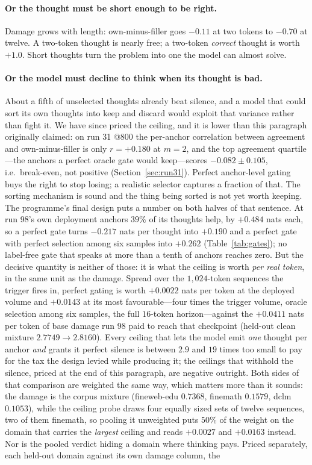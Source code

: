 \documentclass{article} %
\begin{document}
\paragraph{Or the thought must be short enough to be right.} Damage grows with length: own-minus-filler goes $-0.11$ at two tokens to $-0.70$ at twelve. A two-token thought is nearly free; a two-token \emph{correct} thought is worth $+1.0$. Short thoughts turn the problem into one the model can almost solve.

\paragraph{Or the model must decline to think when its thought is bad.} About a fifth of unselected thoughts already beat silence, and a model that could sort its own thoughts into keep and discard would exploit that variance rather than fight it. We have since priced the ceiling, and it is lower than this paragraph originally claimed: on run 31 @800 the per-anchor correlation between agreement and own-minus-filler is only $r = +0.180$ at $m=2$, and the top agreement quartile---the anchors a perfect oracle gate would keep---scores $-0.082 \pm 0.105$, i.e.\ break-even, not positive (Section~\ref{sec:run31}). Perfect anchor-level gating buys the right to stop losing; a realistic selector captures a fraction of that. The sorting mechanism is sound and the thing being sorted is not yet worth keeping. The programme's final design puts a number on both halves of that sentence. At run 98's own deployment anchors $39\%$ of its thoughts help, by $+0.484$ nats each, so a perfect gate turns $-0.217$ nats per thought into $+0.190$ and a perfect gate with perfect selection among six samples into $+0.262$ (Table~\ref{tab:gates}); no label-free gate that speaks at more than a tenth of anchors reaches zero. But the decisive quantity is neither of those: it is what the ceiling is worth \emph{per real token}, in the same unit as the damage. Spread over the $1{,}024$-token sequences the trigger fires in, perfect gating is worth $+0.0022$ nats per token at the deployed volume and $+0.0143$ at its most favourable---four times the trigger volume, oracle selection among six samples, the full $16$-token horizon---against the $+0.0411$ nats per token of base damage run 98 paid to reach that checkpoint (held-out clean mixture $2.7749 \to 2.8160$). Every ceiling that lets the model emit \emph{one} thought per anchor \emph{and} grants it perfect silence is between $2.9$ and $19$ times too small to pay for the tax the design levied while producing it; the ceilings that withhold the silence, priced at the end of this paragraph, are negative outright. Both sides of that comparison are weighted the same way, which matters more than it sounds: the damage is the corpus mixture (fineweb-edu $0.7368$, finemath $0.1579$, dclm $0.1053$), while the ceiling probe draws four equally sized sets of twelve sequences, two of them finemath, so pooling it unweighted puts $50\%$ of the weight on the domain that carries the \emph{largest} ceiling and reads $+0.0027$ and $+0.0163$ instead. Nor is the pooled verdict hiding a domain where thinking pays. Priced separately, each held-out domain against its own damage column, the 
\end{document}
